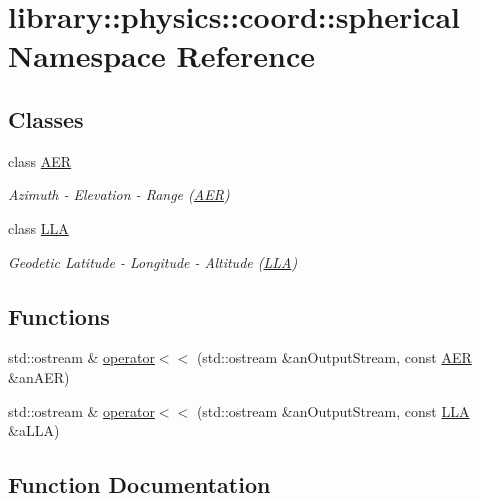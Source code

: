 \hypertarget{namespacelibrary_1_1physics_1_1coord_1_1spherical}{}\section{library\+:\+:physics\+:\+:coord\+:\+:spherical Namespace Reference}
\label{namespacelibrary_1_1physics_1_1coord_1_1spherical}
\subsection*{Classes}
\begin{DoxyCompactItemize}
\item 
class \hyperlink{classlibrary_1_1physics_1_1coord_1_1spherical_1_1_a_e_r}{A\+ER}
\begin{DoxyCompactList}\small\item\em Azimuth -\/ Elevation -\/ Range (\hyperlink{classlibrary_1_1physics_1_1coord_1_1spherical_1_1_a_e_r}{A\+ER}) \end{DoxyCompactList}\item 
class \hyperlink{classlibrary_1_1physics_1_1coord_1_1spherical_1_1_l_l_a}{L\+LA}
\begin{DoxyCompactList}\small\item\em Geodetic Latitude -\/ Longitude -\/ Altitude (\hyperlink{classlibrary_1_1physics_1_1coord_1_1spherical_1_1_l_l_a}{L\+LA}) \end{DoxyCompactList}\end{DoxyCompactItemize}
\subsection*{Functions}
\begin{DoxyCompactItemize}
\item 
std\+::ostream \& \hyperlink{namespacelibrary_1_1physics_1_1coord_1_1spherical_a329c02f24427c714fd34c3ea372f7c95}{operator$<$$<$} (std\+::ostream \&an\+Output\+Stream, const \hyperlink{classlibrary_1_1physics_1_1coord_1_1spherical_1_1_a_e_r}{A\+ER} \&an\+A\+ER)
\item 
std\+::ostream \& \hyperlink{namespacelibrary_1_1physics_1_1coord_1_1spherical_ae657b9eb35f35ee5db9f1a50e64f77a5}{operator$<$$<$} (std\+::ostream \&an\+Output\+Stream, const \hyperlink{classlibrary_1_1physics_1_1coord_1_1spherical_1_1_l_l_a}{L\+LA} \&a\+L\+LA)
\end{DoxyCompactItemize}


\subsection{Function Documentation}
\mbox{\label{namespacelibrary_1_1physics_1_1coord_1_1spherical_a329c02f24427c714fd34c3ea372f7c95}} 
